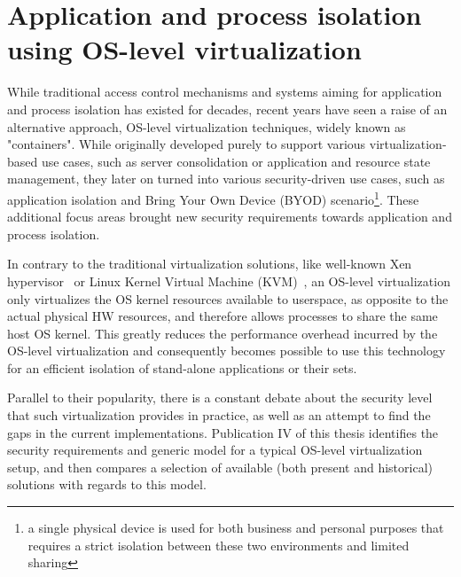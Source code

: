 \section{Application and process isolation using OS-level virtualization}

While traditional access control mechanisms and systems aiming for application and process isolation has existed for decades, recent years have seen a raise of an alternative approach, OS-level virtualization techniques, widely known as "containers". While originally developed purely to support various virtualization-based use cases, such as server consolidation or application and resource state management, they later on turned into various security-driven use cases, such as application isolation and Bring Your Own Device (BYOD) scenario\footnote{a single physical device is used for both business and personal purposes that requires a strict isolation between these two environments and limited sharing}. These additional focus areas brought new security requirements towards application and process isolation.

In contrary to the traditional virtualization solutions, like well-known Xen hypervisor~\cite{xenproject} or Linux Kernel Virtual Machine (KVM)~\cite{kvmproject}, an OS-level virtualization only virtualizes the OS kernel resources available to userspace, as opposite to the actual physical HW resources, and therefore allows processes to share the same host OS kernel. This greatly reduces the performance overhead incurred by the OS-level virtualization and consequently becomes possible to use this technology for an efficient isolation of stand-alone applications or their sets.

Parallel to their popularity, there is a constant debate about the security level that such virtualization provides in practice, as well as an attempt to find the gaps in the current implementations. Publication IV of this thesis identifies the security requirements and generic model for a typical OS-level virtualization setup, and then compares a selection of available (both present and historical) solutions with regards to this model. 


